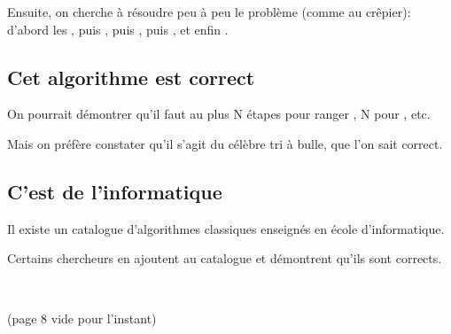 \documentclass[a7paper,pagesize,DIV=14,10pt]{scrbook}
\begin{document}
Ensuite, on cherche à résoudre peu à peu le problème (comme au
crêpier): d'abord les , puis , puis ,
puis , et enfin .

\vspace{-.8\baselineskip}
\subsection*{Cet algorithme est correct}
\vspace{-.5\baselineskip}

On pourrait démontrer qu'il faut au plus N étapes pour ranger
, N pour , etc.

Mais on préfère constater qu'il s'agit du célèbre tri à bulle, que
l'on sait correct.

\vspace{-.8\baselineskip}
\subsection*{C'est de l'informatique}
\vspace{-.5\baselineskip}

Il existe un catalogue d'algorithmes classiques enseignés en école
d'informatique.

Certains chercheurs en ajoutent au catalogue et démontrent qu'ils
sont corrects.


\newpage ~\vfill \centerline{(page 8 vide pour l'instant)} \vfill
\end{document}

